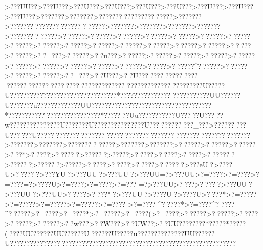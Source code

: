 {{{{{{{{{{{{{{{{{{{{{{{{{{{{{{{{{{{{{{{{{{{{{{{{{{{{{{{{{{{{{{{{{{{{{{{{{{{{{{{{{{{{{{{{{{{{{{{{{{{{{{{{{{{{{{{{{{{{{{{{{{{{{{{{{{{{{{{{{{{{{{{{{{{{{{{{{{{{{{{{{{{{{{{{{{{{{{{{{{{{{{{{{{{{{{{{{{{{{{{{{{{{{{{{{{{{{{{{{{{{{{{{{{{{{{{{{{{{{{{{{{{{{{{{{{{{{{{{{{{{{{{{{{{{{{{{{{{{{{{{{{{{{{{{{{{{{{{{{{{{{{{{{{{{{{{{{{{{{{{{{{{{{{{{{{{{{{{{{{{{{{{{{{{{{{{{{{{{{{{{{{{{{{{{{{{{{{{{{{{{{{{{{{{{{{{{{{{{{{{{{{{{{{{{{{{{{{{{{{{{{{{{{{{{{{{{{{{{{{{{{{{{{{{{{{{{{{{{{{{{{{{{{{{{{{{{{{{{{{{{{{{{{{{{{{{{{{{{{{{{{{{{{{{{{{{{{{{{{{{{{{{{{{{{{{{{{{{{{{{{{{{{{{{{{{{{{{{{{{{{{{{{{{{{{{{{{{{{{{{{{{{{{{{{{{{{{{{{{{{{{{{{{{{{{{{{{{{{{{{{{{{{{{{{{{{{{{{{{{{>???UU??>???U???>???U???>???U???>???U???>???U???>???U???>???U???>???U???>???????>???????>?????????????????????>???????>???????????????????? ??????>???????>???????>???????>???????>?????????????>??????>??????>??????>??????>??????>??????>??????>??????>??????>??????>??????>??????>??????>??????>??????>?????>??????>??_???>??????>??u???>??????>??????>??????>??????>??????>??????>??????>??????>??????>??????>?????>??????^??????>??????>??????>??????>??_???>??U???>??U???????   ?????  ????  ?????? ?????? ?????????????????????
??{???????{??????{???  ????U?????U????????????????????????????????*???????????????
??????? ????UU??????U???????u?????????????UU????????????????????????????????????*?????? ????? ?????  ?????? ?????* ????? ??Uu???????????U?????U?????w???????????????U???????U???????????????U????????????_???>?????????U??????U???????????????????????????????????????????????????????????>???????>???????>?????????????>???????>???????>??????>??????>??????>???*>????? >????? ?>??????>?????>????? >????? >????? >???????>??????>??????>?????>????? >????? >????? >????? ?>???eU?>????U>????? ?>???YU?>???UU?>???UU?>???UU=?>???UU>?=???? >?=???? >?=???? =?>????U>?=???? >?=???? >?=???
 =?>???UU>????  >????  ?>???UU?>???UU?>???UU>????? >????* ?>???UU?>????U?>????U>????* >?=?????>?=?????>?=?????>?=?????>?=????
>?=???? ^?????*>?=???? ^????? ^??????>?=???? >?=????*>?=?????>?=????(>?=????>??????>??????>?????>??????>??????>??w???>??W???>??UW??>??UU????????* ?????*  ?????( ????UU??????UU??????U??????U?????u??????????????UU??????U???????????????????????????????????????????????????????????????????
}}}}}}}}}}}}}}}}}}}}}}}}}}}}}}}}}}}}}}}}}}}}}}}}}}}}}}}}}}}}}}}}}}}}}}}}}}}}}}}}}}}}}}}}}}}}}}}}}}}}}}}}}}}}}}}}}}}}}}}}}}}}}}}}}}}}}}}}}}}}}}}}}}}}}}}}}}}}}}}}}}}}}}}}}}}}}}}}}}}}}}}}}}}}}}}}}}}}}}}}}}}}}}}}}}}}}}}}}}}}}}}}}}}}}}}}}}}}}}}}}}}}}}}}}}}}}}}}}}}}}}}}}}}}}}}}}}}}}}}}}}}}}}}}}}}}}}}}}}}}}}}}}}}}}}}}}}}}}}}}}}}}}}}}}}}}}}}}}}}}}}}}}}}}}}}}}}}}}}}}}}}}}}}}}}}}}}}}}}}}}}}}}}}}}}}}}}}}}}}}}}}}}}}}}}}}}}}}}}}}}}}}}}}}}}}}}}}}}}}}}}}}}}}}}}}}}}}}}}}}}}}}}}}}}}}}}}}}}}}}}}}}}}}}}}}}}}}}}}}}}}}}}}}}}}}}}}}}}}}}}}}}}}}}}}}}}}}}}}}}}}}}}}}}}}}}}}}}}}}}}}}}}}}}}}}}}}}}}}}}}}}}}}}}}}}}}}}}}}}}}}}}}}}}}}}}}}}}}}}}}}}}}}}}}}}}}}}}}}}}}}
